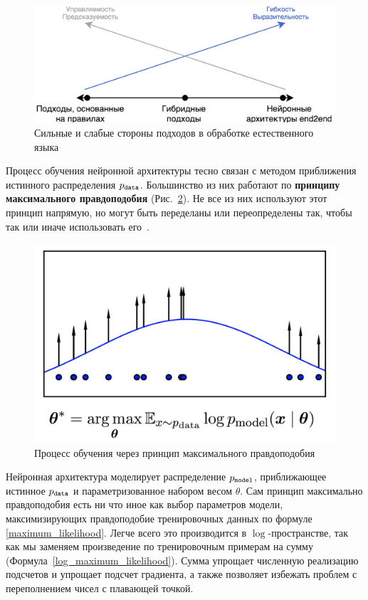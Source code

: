 \documentclass{spbau-diploma}
\begin{document}
\begin{figure}[h]
\centering
\includegraphics[width=\textwidth]{images/approaches.png}
\caption{Сильные и слабые стороны подходов в обработке естественного языка}
\label{approaches}
\end{figure}

Процесс обучения нейронной архитектуры тесно связан с методом приближения 
истинного распределения $p_{\texttt{data}}$. Большинство из них работают по 
\textbf{принципу максимального правдоподобия} (Рис.~\ref{mll_density}). Не 
все из них используют этот принцип напрямую, но могут быть переделаны или
переопределены так, чтобы так или иначе использовать его~\cite{1701.00160}.

\begin{figure}[h]
\centering
\includegraphics[width=\textwidth]{images/mll_density.png}
\caption{Процесс обучения через принцип максимального правдоподобия}
\label{mll_density}
\end{figure}

Нейронная архитектура моделирует распределение $p_{\texttt{model}}$, приближающее истинное
$p_{\texttt{data}}$ и параметризованное набором весом $\theta$. Сам принцип максимально 
правдоподобия есть ни что иное как выбор параметров модели, максимизирующих
правдоподобие тренировочных данных по формуле \ref{maximum_likelihood}. Легче
всего это производится в $\log$-пространстве, так как мы заменяем произведение 
по тренировочным примерам на сумму (Формула~\ref{log_maximum_likelihood}). Сумма
упрощает численную реализацию подсчетов и упрощает подсчет градиента, а также 
позволяет избежать проблем с переполнением чисел с плавающей точкой. 
\end{document}
